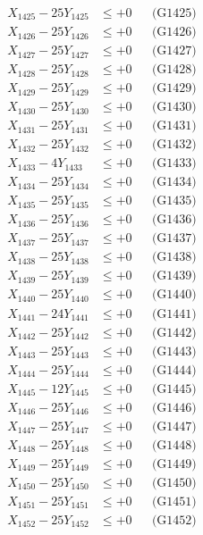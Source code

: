 \documentclass[a4paper,10pt]{article}
\begin{document}
{\begin{align}
X_{1425} - 25Y_{1425} &\leq +0 && \text{(G1425)} \\
X_{1426} - 25Y_{1426} &\leq +0 && \text{(G1426)} \\
X_{1427} - 25Y_{1427} &\leq +0 && \text{(G1427)} \\
X_{1428} - 25Y_{1428} &\leq +0 && \text{(G1428)} \\
X_{1429} - 25Y_{1429} &\leq +0 && \text{(G1429)} \\
X_{1430} - 25Y_{1430} &\leq +0 && \text{(G1430)} \\
\allowbreak
X_{1431} - 25Y_{1431} &\leq +0 && \text{(G1431)} \\
X_{1432} - 25Y_{1432} &\leq +0 && \text{(G1432)} \\
X_{1433} - 4Y_{1433} &\leq +0 && \text{(G1433)} \\
X_{1434} - 25Y_{1434} &\leq +0 && \text{(G1434)} \\
X_{1435} - 25Y_{1435} &\leq +0 && \text{(G1435)} \\
X_{1436} - 25Y_{1436} &\leq +0 && \text{(G1436)} \\
X_{1437} - 25Y_{1437} &\leq +0 && \text{(G1437)} \\
X_{1438} - 25Y_{1438} &\leq +0 && \text{(G1438)} \\
X_{1439} - 25Y_{1439} &\leq +0 && \text{(G1439)} \\
X_{1440} - 25Y_{1440} &\leq +0 && \text{(G1440)} \\
\allowbreak
X_{1441} - 24Y_{1441} &\leq +0 && \text{(G1441)} \\
X_{1442} - 25Y_{1442} &\leq +0 && \text{(G1442)} \\
X_{1443} - 25Y_{1443} &\leq +0 && \text{(G1443)} \\
X_{1444} - 25Y_{1444} &\leq +0 && \text{(G1444)} \\
X_{1445} - 12Y_{1445} &\leq +0 && \text{(G1445)} \\
X_{1446} - 25Y_{1446} &\leq +0 && \text{(G1446)} \\
X_{1447} - 25Y_{1447} &\leq +0 && \text{(G1447)} \\
X_{1448} - 25Y_{1448} &\leq +0 && \text{(G1448)} \\
X_{1449} - 25Y_{1449} &\leq +0 && \text{(G1449)} \\
X_{1450} - 25Y_{1450} &\leq +0 && \text{(G1450)} \\
\allowbreak
X_{1451} - 25Y_{1451} &\leq +0 && \text{(G1451)} \\
X_{1452} - 25Y_{1452} &\leq +0 && \text{(G1452)} \\

\end{align}}
\end{document}
